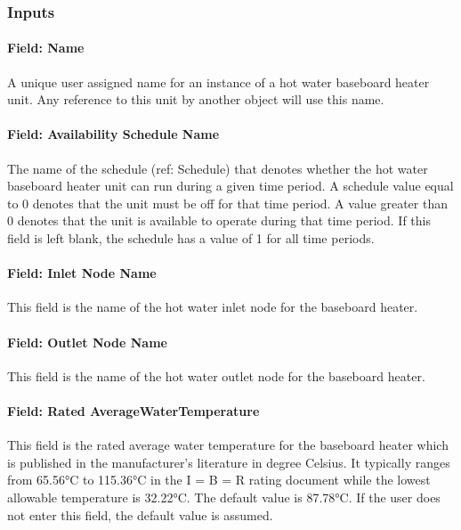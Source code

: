 \subsubsection{Inputs}\label{inputs-038}

\paragraph{Field: Name}\label{field-name-037}

A unique user assigned name for an instance of a hot water baseboard heater unit. Any reference to this unit by another object will use this name.

\paragraph{Field: Availability Schedule Name}\label{field-availability-schedule-name-013}

The name of the schedule (ref: Schedule) that denotes whether the hot water baseboard heater unit can run during a given time period. A schedule value equal to 0 denotes that the unit must be off for that time period. A value greater than 0 denotes that the unit is available to operate during that time period. If this field is left blank, the schedule has a value of 1 for all time periods.

\paragraph{Field: Inlet Node Name}\label{field-inlet-node-name-006}

This field is the name of the hot water inlet node for the baseboard heater.

\paragraph{Field: Outlet Node Name}\label{field-outlet-node-name-007}

This field is the name of the hot water outlet node for the baseboard heater.

\paragraph{Field: Rated AverageWaterTemperature}\label{field-rated-averagewatertemperature}

This field is the rated average water temperature for the baseboard heater which is published in the manufacturer's literature in degree Celsius. It typically ranges from 65.56°C to 115.36°C in the I = B = R rating document while the lowest allowable temperature is 32.22°C. The default value is 87.78°C. If the user does not enter this field, the default value is assumed.


